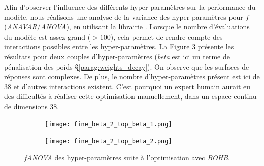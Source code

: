 % 
% 

Afin d'observer l'influence des différents hyper-paramètres sur la performance du modèle, nous réalisons une analyse de la variance des hyper-paramètres pour $f$ (\textit{ANAVAR}/\textit{ANOVA}), en utilisant la librairie \cite{hutter_efficient_2014}.
Lorsque le nombre d'évaluations du modèle est assez grand ($> 100$), cela permet de rendre compte des interactions possibles entre les hyper-paramètres.
La Figure \ref{fig:fanova} présente les résultats pour deux couples d'hyper-paramètres (\textit{beta} est ici un terme de pénalisation des poids §\ref{parag:weights_decay}).
On observe que les surfaces de réponses sont complexes.
De plus, le nombre d'hyper-paramètres présent est ici de 38 et d'autres interactions existent.
C'est pourquoi un expert humain aurait eu des difficultés à réaliser cette optimisation manuellement, dans un espace continu de dimensions 38.

\begin{figure}
    \centering
    \begin{subfigure}{.49\textwidth}
        \centering
        \texttt{[image: fine\_beta\_2\_top\_beta\_1.png]}
        \label{fig:fanova_a}
    \end{subfigure}\hfill%
    \begin{subfigure}{.49\textwidth}
        \centering
        \texttt{[image: fine\_beta\_2\_top\_beta\_2.png]}
        \label{fig:fanova_b}
    \end{subfigure}
    \caption{\textit{fANOVA} des hyper-paramètres suite à l'optimisation avec \textit{BOHB}.}
    \label{fig:fanova}
\end{figure}


